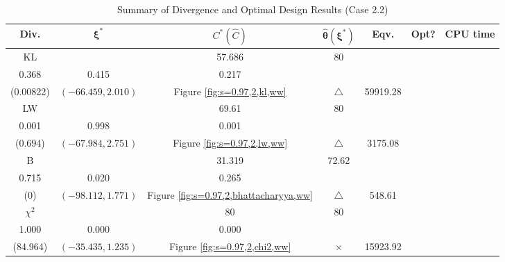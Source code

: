 \documentclass[12pt, a4paper]{article}
\begin{document}
\begin{table}[H]
\centering
\renewcommand{\arraystretch}{1.5} %
\setlength{\tabcolsep}{8pt} %
\begin{tabular}{|c|c|c|c|c|c|c|}
\hline
\textbf{Div.} & \(\boldsymbol{\xi^*}\) & \(C^* (\hat{C})\) & \(\boldsymbol{\hat{\theta}(\xi^*)}\) & \textbf{Eqv.} & \textbf{Opt?} & \textbf{CPU time} \\
\hline
KL & \(\left\{\begin{array}{ccc}
32.545 & 57.686 & 80 \\
0.368 & 0.415 & 0.217
\end{array}\right\}\) &
\(\begin{array}{c}
0.00822 \\
(0.00822)
\end{array}\) & 
\((-66.459, 2.010)\) & 
Figure \ref{fig:s=0.97,2,kl,ww} & $\triangle$ & 59919.28 \\
\hline
LW & \(\left\{\begin{array}{ccc}
66.764 & 69.61 & 80 \\
0.001 & 0.998 & 0.001
\end{array}\right\}\) &
\(\begin{array}{c}
0.694 \\
(0.694)
\end{array}\) & 
\((-67.984, 2.751)\) & 
Figure \ref{fig:s=0.97,2,lw,ww} & $\triangle$ & 3175.08 \\
\hline
B & \(\left\{\begin{array}{ccc}
13.011 & 31.319 & 72.62 \\
0.715 & 0.020 & 0.265
\end{array}\right\}\) &
\(\begin{array}{c}
0 \\
(0)
\end{array}\) & 
\((-98.112, 1.771)\) & 
Figure \ref{fig:s=0.97,2,bhattacharyya,ww} & $\triangle$ & 548.61 \\
\hline
\(\chi^2\) & \(\left\{\begin{array}{ccc}
72.7 & 80 & 80 \\
1.000 & 0.000 & 0.000
\end{array}\right\}\) &
\(\begin{array}{c}
131.333 \\
(84.964)
\end{array}\) & 
\((-35.435, 1.235)\) & 
Figure \ref{fig:s=0.97,2,chi2,ww} & $\times$ & 15923.92 \\
\hline
\end{tabular}
\caption{Summary of Divergence and Optimal Design Results (Case 2.2)}
\label{tab:results2.2}
\end{table}
\end{document}
